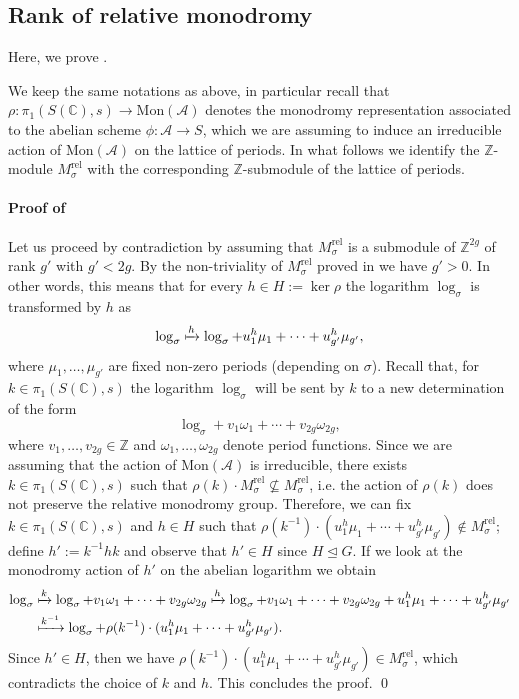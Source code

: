\documentclass[10 pt,a4paper]{article}
\theoremstyle{plain}
\theoremstyle{definition}
\theoremstyle{named}
\newcommand{\cA}{\mathcal A}
\newcommand{\bC}{\mathbb C}
\newcommand{\bZ}{\mathbb Z}
\begin{document}
\subsection{Rank of relative monodromy}\label{section:3.3}

Here, we prove . 

We keep the same notations as above, in particular recall that $\rho: \pi_1(S(\bC),s) \to \textrm{Mon}(\cA)$ denotes the monodromy representation associated to the abelian scheme $\phi: \cA \to S$, which we are assuming to induce an irreducible action of $\textrm{Mon}(\cA)$ on the lattice of periods. In what follows we identify the $\bZ$-module $M_\sigma^\textrm{rel}$ with the corresponding $\bZ$-submodule of the lattice of periods.

\paragraph{Proof of }
    Let us proceed by contradiction by assuming that $M_\sigma^\textrm{rel}$ is a submodule of $\bZ^{2g}$ of rank $g'$ with $g' < 2g$. By the non-triviality of $M_\sigma^\textrm{rel}$ proved in  we have $g'>0$. In other words, this means that for every $h \in H:=\ker{\rho}$ the logarithm $\log_\sigma$ is transformed by $h$ as
    \begin{equation*}%
        \log_\sigma \xmapsto{h} \log_\sigma + u_1^h\mu_1 + \cdots + u_{g'}^h\mu_{g'},
    \end{equation*}
    where $\mu_1, \ldots, \mu_{g'}$ are fixed non-zero periods (depending on $\sigma$). Recall that, for $k \in \pi_1(S(\bC),s)$ the logarithm $\log_\sigma$ will be sent by $k$ to a new determination of the form
    \[
    \log_\sigma + v_1\omega_1 + \cdots + v_{2g} \omega_{2g},
    \]
    where $v_1, \ldots, v_{2g} \in \bZ$ and $\omega_1, \ldots, \omega_{2g}$ denote period functions. Since we are assuming that the action of $\textrm{Mon}(\cA)$ is irreducible, there exists $k \in \pi_1(S(\bC),s)$ such that $\rho(k) \cdot M_\sigma^{\textrm{rel}} \nsubseteq M_\sigma^{\textrm{rel}}$, i.e. the action of $\rho(k)$ does not preserve the relative monodromy group. Therefore, we can fix $k \in \pi_1(S(\bC),s)$ and $h \in H$ such that $\rho(k^{-1})\cdot (u_1^h\mu_1 + \cdots + u_{g'}^h\mu_{g'}) \notin M_\sigma^{\textrm{rel}}$; define $h':=k^{-1}hk$ and observe that $h' \in H$ since $H \unlhd G$. If we look at the monodromy action of $h'$ on the abelian logarithm we obtain
    \begin{align*}
        \log_\sigma &\xmapsto{k} \log_\sigma + v_1\omega_1 + \cdots + v_{2g} \omega_{2g} \xmapsto{h} \log_\sigma + v_1\omega_1 + \cdots + v_{2g} \omega_{2g} + u_1^h\mu_1 + \cdots + u_{g'}^h\mu_{g'}\\
        & \xmapsto{k^{-1}} \log_\sigma +\rho(k^{-1})\cdot(u_1^h\mu_1 + \cdots + u_{g'}^h\mu_{g'}).
    \end{align*}
    Since $h' \in H$, then we have $\rho(k^{-1})\cdot (u_1^h\mu_1 + \cdots + u_{g'}^h\mu_{g'}) \in M_\sigma^{\textrm{rel}}$, which contradicts the choice of $k$ and $h$. This concludes the proof.
\qed
\end{document}
